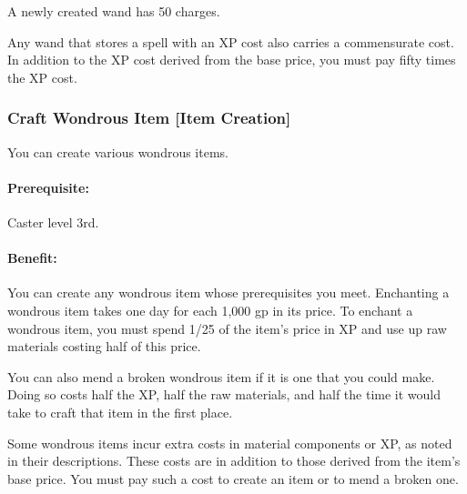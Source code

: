 A newly created wand has 50 charges.

Any wand that stores a spell with an XP cost also carries a commensurate cost. 
In addition to the XP cost derived from the base price, you must pay fifty times the XP cost.

\subsubsection[Craft Wondrous Item]{Craft Wondrous Item [Item Creation]}
\label{Feat:CraftWondrousItem}
You can create various wondrous items.

\paragraph{Prerequisite:} Caster level 3rd.

\paragraph{Benefit:}
You can create any wondrous item whose prerequisites you meet. 
Enchanting a wondrous item takes one day for each 1,000 gp in its price. 
To enchant a wondrous item, you must spend 1/25 of the item's price in XP and use up raw materials costing half of this price.

You can also mend a broken wondrous item if it is one that you could make. 
Doing so costs half the XP, half the raw materials, and half the time it would take to craft that item in the first place.

Some wondrous items incur extra costs in material components or XP, as noted in their descriptions. 
These costs are in addition to those derived from the item’s base price. 
You must pay such a cost to create an item or to mend a broken one.

% 
% 
